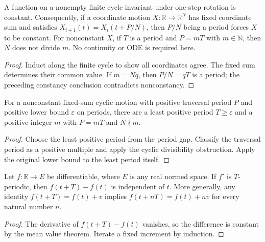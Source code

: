\begin{lemma}
\label{lem:cyclic-period-divisibility}
\leanok
{}
A function on a nonempty finite cycle invariant under one-step rotation
is constant. Consequently, if a coordinate motion $X:\mathbb R\to\mathbb R^N$
has fixed coordinate sum and satisfies
$X_{i+1}(t)=X_i(t+P/N)$, then $P/N$ being a period forces $X$ to be constant.
For nonconstant $X$, if $T$ is a period and $P=mT$ with $m\in\mathbb N$,
then $N$ does not divide $m$. No continuity or ODE is required here.
\end{lemma}
\begin{proof}
\leanok
Induct along the finite cycle to show all coordinates agree. The fixed
sum determines their common value. If $m=Nq$, then $P/N=qT$ is a period;
the preceding constancy conclusion contradicts nonconstancy.
\end{proof}

\begin{proposition}
\label{prop:least-cyclic-period}
\leanok
{}
For a nonconstant fixed-sum cyclic motion with positive traversal period
$P$ and positive lower bound $\varepsilon$ on periods, there are a least
positive period $T\geq\varepsilon$ and a positive integer $m$ with
$P=mT$ and $N\nmid m$.
\end{proposition}
\begin{proof}
\leanok
Choose the least positive period from the period gap. Classify the
traversal period as a positive multiple and apply the cyclic divisibility
obstruction. Apply the original lower bound to the least period itself.
\end{proof}

\begin{lemma}
\label{lem:periodic-primitive-increment}
\leanok
Let $f:\mathbb R\to E$ be differentiable, where $E$ is any real normed
space. If $f'$ is $T$-periodic, then $f(t+T)-f(t)$ is independent of $t$.
More generally, any identity $f(t+T)=f(t)+v$ implies
$f(t+nT)=f(t)+nv$ for every natural number $n$.
\end{lemma}
\begin{proof}
\leanok
The derivative of $f(t+T)-f(t)$ vanishes, so the difference is constant
by the mean value theorem. Iterate a fixed increment by induction.
\end{proof}

